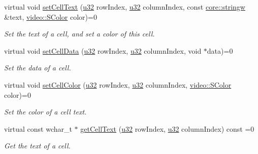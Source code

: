 \begin{DoxyCompactItemize}
virtual void \hyperlink{classirr_1_1gui_1_1IGUITable_ab23ea414e2a01dd8ed8b3ab659318653}{set\+Cell\+Text} (\hyperlink{namespaceirr_a0416a53257075833e7002efd0a18e804}{u32} row\+Index, \hyperlink{namespaceirr_a0416a53257075833e7002efd0a18e804}{u32} column\+Index, const \hyperlink{namespaceirr_1_1core_aef83fafbb1b36fcce44c07c9be23a7f2}{core\+::stringw} \&text, \hyperlink{classirr_1_1video_1_1SColor}{video\+::\+S\+Color} color)=0
\begin{DoxyCompactList}\small\item\em Set the text of a cell, and set a color of this cell. \end{DoxyCompactList}\item 
\mbox{\label{classirr_1_1gui_1_1IGUITable_a88ddb4a8f63fd42a823b7f9363b9b877}} 
virtual void \hyperlink{classirr_1_1gui_1_1IGUITable_a88ddb4a8f63fd42a823b7f9363b9b877}{set\+Cell\+Data} (\hyperlink{namespaceirr_a0416a53257075833e7002efd0a18e804}{u32} row\+Index, \hyperlink{namespaceirr_a0416a53257075833e7002efd0a18e804}{u32} column\+Index, void $\ast$data)=0
\begin{DoxyCompactList}\small\item\em Set the data of a cell. \end{DoxyCompactList}\item 
\mbox{\label{classirr_1_1gui_1_1IGUITable_abc650141a64f7e9f61cc5f8521b51ab4}} 
virtual void \hyperlink{classirr_1_1gui_1_1IGUITable_abc650141a64f7e9f61cc5f8521b51ab4}{set\+Cell\+Color} (\hyperlink{namespaceirr_a0416a53257075833e7002efd0a18e804}{u32} row\+Index, \hyperlink{namespaceirr_a0416a53257075833e7002efd0a18e804}{u32} column\+Index, \hyperlink{classirr_1_1video_1_1SColor}{video\+::\+S\+Color} color)=0
\begin{DoxyCompactList}\small\item\em Set the color of a cell text. \end{DoxyCompactList}\item 
\mbox{\label{classirr_1_1gui_1_1IGUITable_a73ee7498cab65b75dafc60e0deb8c85b}} 
virtual const wchar\+\_\+t $\ast$ \hyperlink{classirr_1_1gui_1_1IGUITable_a73ee7498cab65b75dafc60e0deb8c85b}{get\+Cell\+Text} (\hyperlink{namespaceirr_a0416a53257075833e7002efd0a18e804}{u32} row\+Index, \hyperlink{namespaceirr_a0416a53257075833e7002efd0a18e804}{u32} column\+Index) const =0
\begin{DoxyCompactList}\small\item\em Get the text of a cell. \end{DoxyCompactList}\item 

\end{DoxyCompactItemize}
